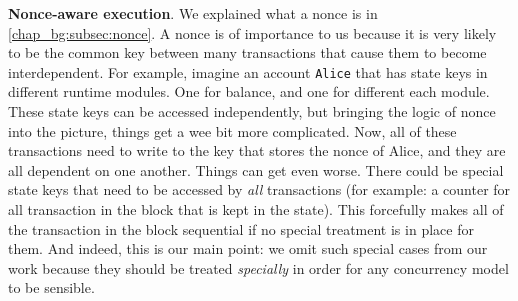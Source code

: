 \textbf{Nonce-aware execution}. We explained what a nonce is in \ref{chap_bg:subsec:nonce}. A nonce
is of importance to us because it is very likely to be the common key between many transactions that
cause them to become interdependent. For example, imagine an account \texttt{Alice} that has state
keys in different runtime modules. One for balance, and one for different each module. These state
keys can be accessed independently, but bringing the logic of nonce into the picture, things get a
wee bit more complicated. Now, all of these transactions need to write to the key that stores the
nonce of Alice, and they are all dependent on one another. Things can get even worse. There could be
special state keys that need to be accessed by \textit{all} transactions (for example: a counter for
all transaction in the block that is kept in the state). This forcefully makes all of the
transaction in the block sequential if no special treatment is in place for them. And indeed, this
is our main point: we omit such special cases from our work because they should be treated
\textit{specially} in order for any concurrency model to be sensible.
